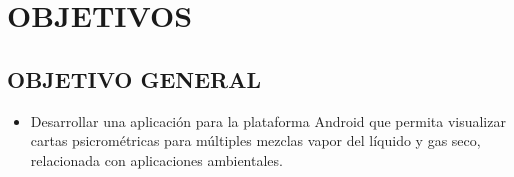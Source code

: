 \section{OBJETIVOS}
\label{chap:sec:objetivos}

    \subsection{OBJETIVO GENERAL}
    \begin{itemize}
        \item Desarrollar una aplicación para la plataforma Android que permita visualizar cartas psicrométricas para múltiples mezclas vapor del líquido y gas seco, relacionada con aplicaciones ambientales. %
    \end{itemize}
    
